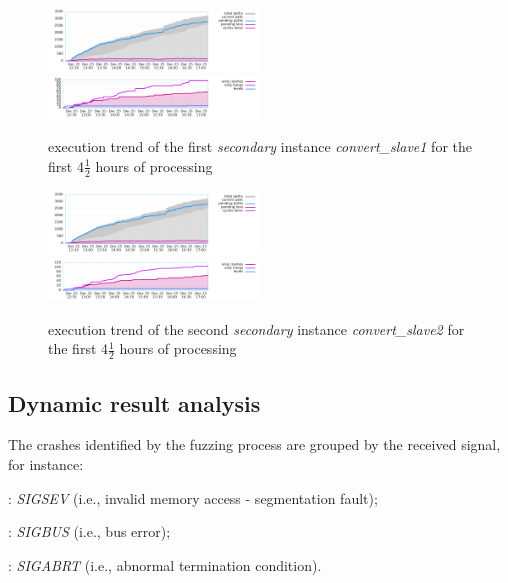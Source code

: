 \begin{figure}[H]
    \centering
    \includegraphics[width=0.5\textwidth]{Resources/convert_slave1/high_freq.png}\hfill
    \includegraphics[width=0.5\textwidth]{Resources/convert_slave1/low_freq.png}
    \caption{execution trend of the first \textit{secondary} instance \textit{convert\_slave1} for the first 4$\frac{1}{2}$ hours of processing}
    \label{fig:convert_slave1}
\end{figure}

\begin{figure}[H]
    \centering
    \includegraphics[width=0.5\textwidth]{Resources/convert_slave2/high_freq.png}\hfill
    \includegraphics[width=0.5\textwidth]{Resources/convert_slave2/low_freq.png}
    \caption{execution trend of the second \textit{secondary} instance \textit{convert\_slave2} for the first 4$\frac{1}{2}$ hours of processing}
    \label{fig:convert_slave2}
\end{figure}

\subsection{Dynamic result analysis}
The crashes identified by the fuzzing process are grouped by the received signal, for instance\parencite{signals}:
\begin{description}[itemsep=0.5pt]
    \item[sig$\cdot$11]: \textit{SIGSEV} (i.e., invalid memory access - segmentation fault);
    \item[sig$\cdot$07]: \textit{SIGBUS} (i.e., bus error);
    \item[sig$\cdot$06]: \textit{SIGABRT} (i.e., abnormal termination condition).
\end{description}

